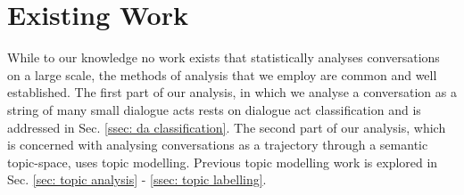 \chapter{Existing Work}

While to our knowledge no work exists that statistically analyses conversations on a large scale, the methods of analysis that we employ are common and well established. The first part of our analysis, in which we analyse a conversation as a string of many small dialogue acts rests on dialogue act classification and is addressed in Sec. \ref{ssec: da classification}. The second part of our analysis, which is concerned with analysing conversations as a trajectory through a semantic topic-space, uses topic modelling. Previous topic modelling work is explored in Sec. \ref{sec: topic analysis} - \ref{ssec: topic labelling}.



 
 
 